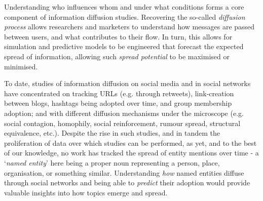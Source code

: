 \documentclass[10pt,journal,compsoc]{IEEEtran}
\begin{document}
\maketitle


\IEEEdisplaynontitleabstractindextext



%
\IEEEpeerreviewmaketitle


Understanding who influences whom and under what conditions forms a core component of information diffusion studies.
Recovering the so-called \emph{diffusion process} allows researchers and marketers to understand how messages are passed between users, and what contributes to their flow.
In turn, this allows for simulation and predictive models to be engineered that forecast the expected spread of information, allowing such \emph{spread potential} to be maximised or minimised.

To date, studies of information diffusion on social media and in social networks have concentrated on tracking URLs (e.g. through retweets), link-creation between blogs, hashtags being adopted over time, and group membership adoption; and with different diffusion mechanisms under the microscope (e.g. social contagion, homophily, social reinforcement, rumour spread, structural equivalence, etc.).
Despite the rise in such studies, and in tandem the proliferation of data over which studies can be performed, as yet, and to the best of our knowledge, no work has tracked the spread of entity mentions over time - a `\emph{named entity}' here being a proper noun representing a person, place, organisation, or something similar.
Understanding \emph{how} named entities diffuse through social networks and being able to \emph{predict} their adoption would provide valuable insights into how topics emerge and spread.
\end{document}
